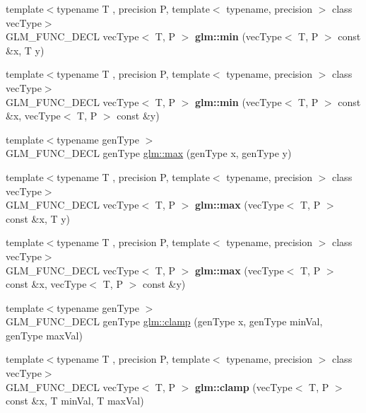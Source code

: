 \begin{DoxyCompactItemize}
{\footnotesize template$<$typename T , precision P, template$<$ typename, precision $>$ class vec\+Type$>$ }\\G\+L\+M\+\_\+\+F\+U\+N\+C\+\_\+\+D\+E\+CL vec\+Type$<$ T, P $>$ {\bfseries glm\+::min} (vec\+Type$<$ T, P $>$ const \&x, T y)
\item 
\mbox{\label{group__core__func__common_ga502b20a691e374cf42dea6e3d126d476}} 
{\footnotesize template$<$typename T , precision P, template$<$ typename, precision $>$ class vec\+Type$>$ }\\G\+L\+M\+\_\+\+F\+U\+N\+C\+\_\+\+D\+E\+CL vec\+Type$<$ T, P $>$ {\bfseries glm\+::min} (vec\+Type$<$ T, P $>$ const \&x, vec\+Type$<$ T, P $>$ const \&y)
\item 
{\footnotesize template$<$typename gen\+Type $>$ }\\G\+L\+M\+\_\+\+F\+U\+N\+C\+\_\+\+D\+E\+CL gen\+Type \hyperlink{group__core__func__common_ga98caa7f95a94c86a86ebce893a45326c}{glm\+::max} (gen\+Type x, gen\+Type y)
\item 
\mbox{\label{group__core__func__common_ga1a31d3f13a4bd0aa9828e263b7ac5896}} 
{\footnotesize template$<$typename T , precision P, template$<$ typename, precision $>$ class vec\+Type$>$ }\\G\+L\+M\+\_\+\+F\+U\+N\+C\+\_\+\+D\+E\+CL vec\+Type$<$ T, P $>$ {\bfseries glm\+::max} (vec\+Type$<$ T, P $>$ const \&x, T y)
\item 
\mbox{\label{group__core__func__common_gad2ac6877ac7872a402ef5cae9bc6a30b}} 
{\footnotesize template$<$typename T , precision P, template$<$ typename, precision $>$ class vec\+Type$>$ }\\G\+L\+M\+\_\+\+F\+U\+N\+C\+\_\+\+D\+E\+CL vec\+Type$<$ T, P $>$ {\bfseries glm\+::max} (vec\+Type$<$ T, P $>$ const \&x, vec\+Type$<$ T, P $>$ const \&y)
\item 
{\footnotesize template$<$typename gen\+Type $>$ }\\G\+L\+M\+\_\+\+F\+U\+N\+C\+\_\+\+D\+E\+CL gen\+Type \hyperlink{group__core__func__common_ga93bce26c7d80d30a62f5c508f8498a6c}{glm\+::clamp} (gen\+Type x, gen\+Type min\+Val, gen\+Type max\+Val)
\item 
\mbox{\label{group__core__func__common_gaf9deddb167a3055ca51cd9af3ce535f6}} 
{\footnotesize template$<$typename T , precision P, template$<$ typename, precision $>$ class vec\+Type$>$ }\\G\+L\+M\+\_\+\+F\+U\+N\+C\+\_\+\+D\+E\+CL vec\+Type$<$ T, P $>$ {\bfseries glm\+::clamp} (vec\+Type$<$ T, P $>$ const \&x, T min\+Val, T max\+Val)

\end{DoxyCompactItemize}
